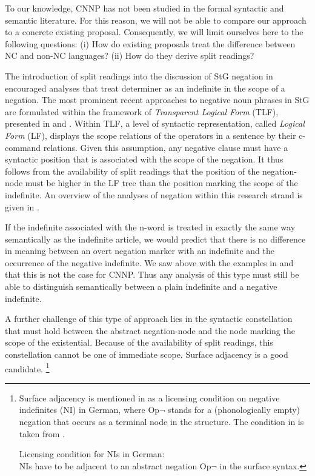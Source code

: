 \documentclass[output=paper]{langsci/langscibook}
\begin{document}
To our knowledge, CNNP has not been studied in the formal syntactic and semantic literature. 
For this reason, we will not be able to compare our approach to a concrete existing proposal.
%
Consequently, we will limit ourselves here to the following questions: (i) How do existing proposals treat the difference between NC and non-NC languages? 
(ii) How do they derive split readings? 

The introduction of split readings into the discussion of StG negation in \citet{Jacobs:80} encouraged analyses that treat determiner  as an indefinite  in the scope of a negation. 
%
The most prominent recent approaches to negative noun phrases in StG are formulated within the framework of \emph{Transparent Logical Form} (TLF), presented in \citet{Stechow:93}  and \citet{Heim:Kratzer:98}.
Within TLF, a level of syntactic representation, called \emph{Logical Form} (LF), displays the scope relations of the operators in a sentence by their c-command relations. 
Given this assumption, any negative clause must have a syntactic position that is associated with the scope of the negation. 
It thus follows from the availability of split readings that the position of the negation-node must be higher in the LF tree than the position marking the scope of the indefinite. 
An overview of the analyses of negation within this research strand is given in \citet{Zeijlstra:16}.

If the indefinite associated with the n-word is treated in exactly the same way semantically as the indefinite article, we would predict that there is no difference in meaning between an overt negation marker with an indefinite and the occurrence of the negative indefinite. We saw above with the examples in  and  that this is not the case for CNNP. Thus any analysis of this type must still be able to distinguish semantically between a plain indefinite and a negative indefinite.

A further challenge of this type of approach lies in the syntactic constellation that must hold between the abstract negation-node and the node marking the scope of the existential.
Because of the availability of split readings, this constellation cannot be one of immediate scope. Surface adjacency is a good candidate.%
\footnote{Surface adjacency is mentioned in \citet{Penka:11} as a licensing condition on negative indefinites (NI) in German, where Op$\lnot$ stands for a (phonologically empty) negation that occurs as a terminal node in the structure. The condition in  is taken from \cite[112]{Penka:11}.

\ea \label{penka-adjacent}
Licensing condition for NIs in German:\\
NIs have to be adjacent to an abstract negation Op$\lnot$ in the surface syntax.
\z 

}
\end{document}
